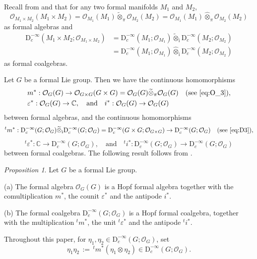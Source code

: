 \documentclass[12pt, a4paper]{amsart}
\newcommand{\BC}{{\mathbb {C}}}
\newcommand{\CO}{{\mathcal {O}}}
\newcommand{\RD}{{\mathrm {D}}}
\newcommand{\Ri}{{\mathrm{i}}}
\newcommand{\wt}{\widetilde}
\newcommand{\wh}{\widehat}
\newcommand{\be}{\begin {equation}}
\newcommand{\ee}{\end {equation}}
\newcommand{\qaq}{\quad\textrm{and}\quad}
\theoremstyle{Theorem}
\theoremstyle{Theorem}
\theoremstyle{Theorem}
\theoremstyle{Theorem}
\theoremstyle{Plain}
\theoremstyle{remark}
\theoremstyle{remark}
\theoremstyle{Definition}
\newtheorem{prpd}[dfn]{Proposition}
\numberwithin{equation}{section}
\begin{document}


Recall from \cite[Theorem 1.9]{CSW1} and \cite[Proposition 5.20]{CSW2} that for any two formal manifolds $M_1$ and $M_2$, \be \label{eq:O_3}\CO_{M_1\times M_2}(M_1\times M_2)=\CO_{M_1}(M_1)\wt\otimes_{\pi}\CO_{M_2}(M_2)=\CO_{M_1}(M_1)\wh\otimes_{\pi}\CO_{M_2}(M_2)\ee as formal algebras and \be\label{eq:D3}
\begin{split}
\RD^{-\infty}_c(M_1\times M_2;\CO_{M_1\times M_2})
&=\RD^{-\infty}_c(M_1;\CO_{M_1})\wt\otimes_{\Ri}
\RD^{-\infty}_c(M_2;\CO_{M_2})\\
&=\RD^{-\infty}_c(M_1;\CO_{M_1})\wh\otimes_{\Ri}
\RD^{-\infty}_c(M_2;\CO_{M_2})
\end{split}
\ee
 as formal coalgebras. 

 Let $G$ be a formal Lie group. Then we have the continuous homomorphisms 
 \be\label{eq:formalhopfalg}
\begin{aligned}
		&m^*:\CO_G(G)\rightarrow \CO_{G\times G}(G\times G)=\CO_G(G) \wt{\otimes}_{\pi}\CO_G(G)\quad\text{(see \eqref{eq:O_3})},\\ 
 	&\varepsilon ^*: \CO_G(G)\rightarrow \BC, \qaq   i^*: \CO_G(G)\rightarrow \CO_G(G)
\end{aligned}
\ee
between formal algebras, 
and the continuous homomorphisms 
\[{}^tm^*: \RD^{-\infty}_c(G;\CO_G)\wt\otimes_{\mathrm i}\RD^{-\infty}_c(G;\CO_G)=\RD^{-\infty}_c(G\times G;\CO_{G\times G})\rightarrow \RD^{-\infty}_c(G;\CO_G) \quad\text{(see \eqref{eq:D3})},\]
   \[ {}^t\varepsilon^*: \BC\rightarrow \RD^{-\infty}_c(G;\CO_G), \qaq {}^ti^*: \RD^{-\infty}_c(G;\CO_G)\rightarrow \RD^{-\infty}_c(G;\CO_G)
\]
between formal coalgebras. %
The following result follows from \cite[Proposition 9.1]{CSW4}.
\begin{prpd}\label{prop:formalliegrouptohopfalg0}
    Let $G$ be a formal Lie group. 
    
\noindent(a) The formal algebra $\CO_G(G)$ is a Hopf formal algebra together with the comultiplication $m^*$, the counit $\varepsilon^*$ and 
the antipode $i^*$.

\noindent(b) The formal coalgebra $\RD^{-\infty}_c(G;\CO_G)$ is a Hopf formal coalgebra,
together with the multiplication ${}^tm^*$, the unit ${}^t\varepsilon^*$ and 
the antipode ${}^ti^*$.  
\end{prpd}
Throughout this paper, for $\eta_1,\eta_2\in \RD^{-\infty}_c(G;\CO_G)$, set \be\label{eq:eta12} \eta_1\eta_2\,:=\, {}^tm^*(\eta_1\otimes\eta_2)\in \RD^{-\infty}_c(G;\CO_G). \ee
\end{document}
